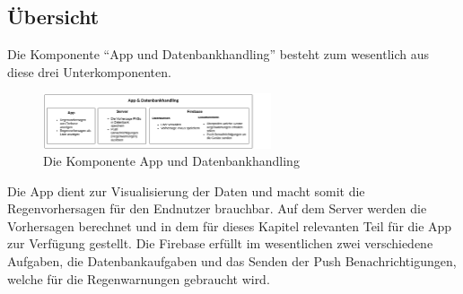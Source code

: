 \subsection{Übersicht}\label{übersicht}
Die Komponente “App und Datenbankhandling” besteht zum wesentlich aus diese drei Unterkomponenten.  

\begin{figure}[h]
 \centering
 \includegraphics[width=0.6\textwidth,angle=0]{abb/app_datenbank_komponente_uebersicht}
 \caption[Komponentenübersicht App und Datenbankhandling]{Die Komponente App und Datenbankhandling}
\label{fig:Beschreibung}
\end{figure}

Die App dient zur Visualisierung der Daten und macht somit die Regenvorhersagen für den Endnutzer brauchbar. 
Auf dem Server werden die Vorhersagen berechnet und in dem für dieses Kapitel relevanten Teil
für die App zur Verfügung gestellt. 
Die Firebase erfüllt im wesentlichen zwei verschiedene Aufgaben, die Datenbankaufgaben und das Senden der 
Push Benachrichtigungen, welche für die Regenwarnungen gebraucht wird.
 
